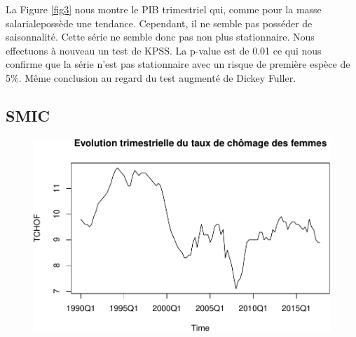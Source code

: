 \documentclass[11pt,]{article}
\newenvironment{Shaded}{\begin{snugshade}}{\end{snugshade}}
\newcommand{\KeywordTok}[1]{\textcolor[rgb]{0.13,0.29,0.53}{\textbf{#1}}}
\newcommand{\DataTypeTok}[1]{\textcolor[rgb]{0.13,0.29,0.53}{#1}}
\newcommand{\DecValTok}[1]{\textcolor[rgb]{0.00,0.00,0.81}{#1}}
\newcommand{\FloatTok}[1]{\textcolor[rgb]{0.00,0.00,0.81}{#1}}
\newcommand{\StringTok}[1]{\textcolor[rgb]{0.31,0.60,0.02}{#1}}
\newcommand{\OperatorTok}[1]{\textcolor[rgb]{0.81,0.36,0.00}{\textbf{#1}}}
\newcommand{\NormalTok}[1]{#1}
\begin{document}
La Figure \ref{fig3} nous montre le PIB trimestriel qui, comme pour la
masse salarialepossède une tendance. Cependant, il ne semble pas
posséder de saisonnalité. Cette série ne semble donc pas non plus
stationnaire. Nous effectuons à nouveau un test de KPSS. La p-value est
de 0.01 ce qui nous confirme que la série n'est pas stationnaire avec un
risque de première espèce de 5\%. Même conclusion au regard du test
augmenté de Dickey Fuller.

\subsection{SMIC}\label{smic}

\begin{Shaded}
\end{Shaded}

\begin{figure}

{\centering \includegraphics{doc_files/figure-latex/unnamed-chunk-5-1} 

}

\caption{\label{fig5}}\label{fig:unnamed-chunk-5}
\end{figure}
\end{document}
